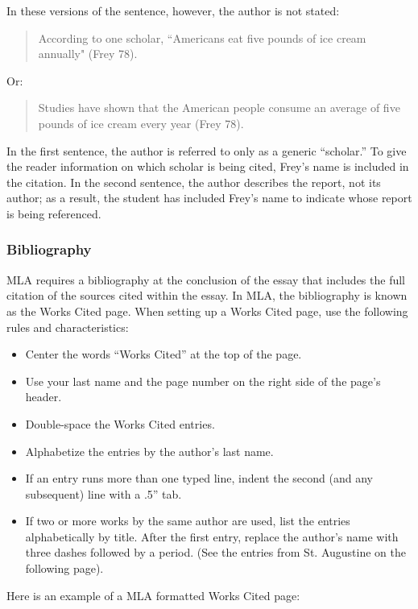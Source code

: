 \documentclass[12pt, hidelinks]{article} %
\begin{document}
In these versions of the sentence, however, the author is not stated:

\begin{quote}
According to one scholar, ``Americans eat five pounds of ice cream annually" (Frey 78).
\end{quote}
Or:

\begin{quote}
Studies have shown that the American people consume an average of five pounds of ice cream every year (Frey 78).
\end{quote}
In the first sentence, the author is referred to only as a generic ``scholar.'' To give the reader information on which scholar is being cited, Frey's name is included in the citation. In the second sentence, the author describes the report, not its author; as a result, the student has included Frey's name to indicate whose report is being referenced. 


\subsubsection{Bibliography}

MLA requires a bibliography at the conclusion of the essay that includes the full citation of the sources cited within the essay. In MLA, the bibliography is known as the Works Cited page. When setting up a Works Cited page, use the following rules and characteristics:

\begin{itemize}
\item Center the words ``Works Cited'' at the top of the page.
\item Use your last name and the page number on the right side of the page's header.
\item Double-space the Works Cited entries.
\item Alphabetize the entries by the author's last name.
\item If an entry runs more than one typed line, indent the second (and any subsequent) line with a .5'' tab.
\item If two or more works by the same author are used, list the entries alphabetically by title. After the first entry, replace the author's name with three dashes followed by a period. (See the entries from St. Augustine on the following page).
\end{itemize}


Here is an example of a MLA formatted Works Cited page:
\end{document}
